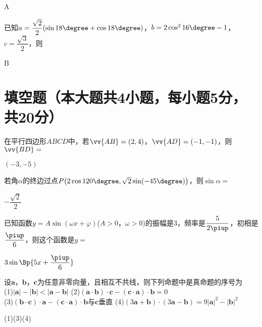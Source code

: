     \begin{minipage}[htbp!]{0.25\linewidth}
        \vspace{-1.5em}
    \end{minipage}
    \begin{answer}
      A
    \end{answer}
  \item
    已知$a=\dfrac{\sqrt2}2(\sin{18\degree}+\cos{18\degree})$，$b=2\cos^2{16\degree}-1$，$c=\dfrac{\sqrt3}2$，则\xz
    \\
    \begin{answer}
      B
    \end{answer}
\par
\section{填空题（本大题共4小题，每小题5分，共20分）}
  \item
     在平行四边形$ABCD$中，若$\vv{AB}=(2,4)$，$\vv{AD}=(-1,-1)$，则$\vv{BD}=$\tk
    \begin{answer}
      $(-3,-5)$
    \end{answer}
  \item
     若角$\alpha$的终边过点$P\bigl(2\cos{120\degree},\sqrt2\sin(-45\degree)\bigr)$，则$\sin\alpha=$\tk
     \begin{answer}
       $-\dfrac{\sqrt2}2$
     \end{answer}
  \item
     已知函数$y=A\sin(\omega x+\varphi)$($A>0$，$\omega>0$)的振幅是$3$，频率是$\dfrac5{2\piup}$，初相是$\dfrac{\piup}6$，则这个函数是$y=$\tk
    \begin{answer}
      $3\sin\Bp{5x+\dfrac{\piup}6}$
    \end{answer}
  \item
    设$\bm a$，$\bm b$，$\bm c$为任意非零向量，且相互不共线，则下列命题中是真命题的序号为\tk\\
    (1)$|\bm a|-|\bm b|<|\bm a-\bm b|$\hspace{4em}
    (2)$(\bm a\cdot\bm b)\cdot\bm c-(\bm c\cdot\bm a)\cdot\bm b=0$\\
    (3)$(\bm b\cdot\bm c)\cdot\bm a-(\bm c\cdot\bm a)\cdot\bm b$与$\bm c$垂直\hspace{2em}
    (4)$(3\bm a+\bm b)\cdot(3\bm a-\bm b)=9|\bm a|^2-|\bm b|^2$
    \begin{answer}
      (1)(3)(4)
    \end{answer}
